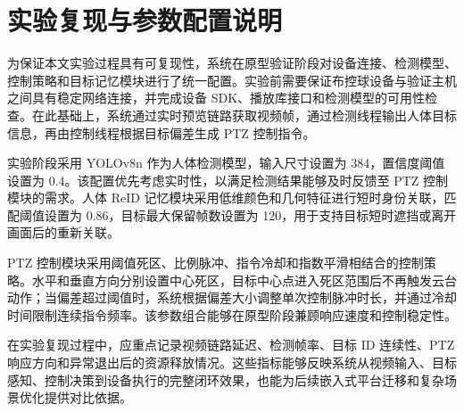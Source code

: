 \chapter{实验复现与参数配置说明}

为保证本文实验过程具有可复现性，系统在原型验证阶段对设备连接、检测模型、控制策略和目标记忆模块进行了统一配置。实验前需要保证布控球设备与验证主机之间具有稳定网络连接，并完成设备 SDK、播放库接口和检测模型的可用性检查。在此基础上，系统通过实时预览链路获取视频帧，通过检测线程输出人体目标信息，再由控制线程根据目标偏差生成 PTZ 控制指令。

实验阶段采用 YOLOv8n 作为人体检测模型，输入尺寸设置为 384，置信度阈值设置为 0.4。该配置优先考虑实时性，以满足检测结果能够及时反馈至 PTZ 控制模块的需求。人体 ReID 记忆模块采用低维颜色和几何特征进行短时身份关联，匹配阈值设置为 0.86，目标最大保留帧数设置为 120，用于支持目标短时遮挡或离开画面后的重新关联。

PTZ 控制模块采用阈值死区、比例脉冲、指令冷却和指数平滑相结合的控制策略。水平和垂直方向分别设置中心死区，目标中心点进入死区范围后不再触发云台动作；当偏差超过阈值时，系统根据偏差大小调整单次控制脉冲时长，并通过冷却时间限制连续指令频率。该参数组合能够在原型阶段兼顾响应速度和控制稳定性。

在实验复现过程中，应重点记录视频链路延迟、检测帧率、目标 ID 连续性、PTZ 响应方向和异常退出后的资源释放情况。这些指标能够反映系统从视频输入、目标感知、控制决策到设备执行的完整闭环效果，也能为后续嵌入式平台迁移和复杂场景优化提供对比依据。
